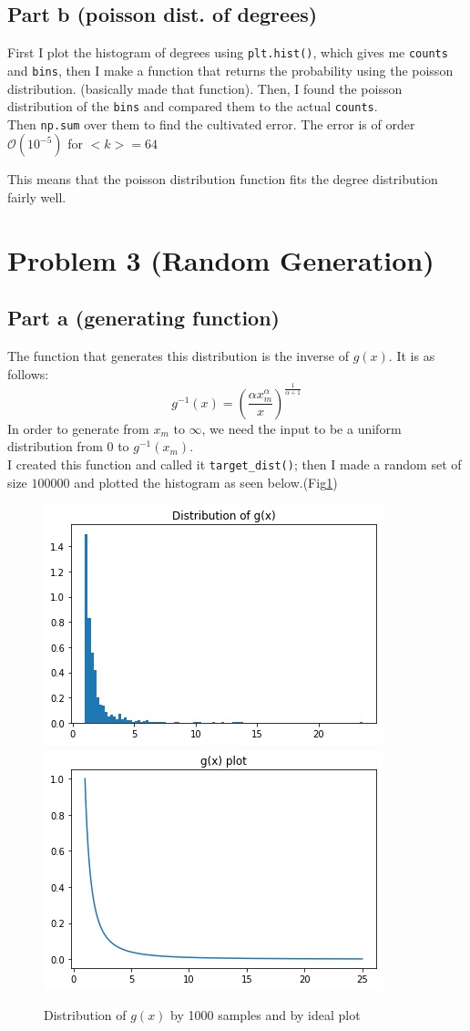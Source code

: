 \documentclass[12pt]{article}
\begin{document}
	\subsection{Part b (poisson dist. of degrees)}
	First I plot the histogram of degrees using \texttt{plt.hist()}, which gives me \texttt{counts}
	and \texttt{bins}, then I make a function that returns the probability using the poisson distribution. (basically made that function). Then, I found the poisson distribution of the \texttt{bins} and compared them to the actual \texttt{counts}. \\
	Then \texttt{np.sum} over them to find the cultivated error. The error is of order $\mathcal{O}(10^{-5})$ for $<k> = 64$
	
	This means that the poisson distribution function fits the degree distribution fairly well.
	\section{Problem 3 (Random Generation)}
	\subsection{Part a (generating function)}
	The function that generates this distribution is the inverse of $g(x)$. It is as follows:
	\begin{equation}
		g^{-1}(x) = \left(\frac{\alpha x_m^\alpha}{x}\right)^{\frac{1}{\alpha + 1}}
	\end{equation}
	In order to generate from $x_m$ to $\infty$, we need the input to be a uniform distribution
	from $0$ to $g^{-1}(x_m)$.\\
	I created this function and called it \texttt{target\_dist()}; then I made a random set of size 
	$100000$ and plotted the histogram as seen below.(Fig\ref{fig:reverse})
	\begin{figure}[h]
		\centering
		\includegraphics[width=.4\linewidth]{../p3/reverse.jpg}
		\includegraphics[width=.4\linewidth]{../p3/reverseplot.jpg}
		\label{fig:reverse}
		\caption{Distribution of $g(x)$ by 1000 samples and by ideal plot}
	\end{figure}
	
\end{document}
